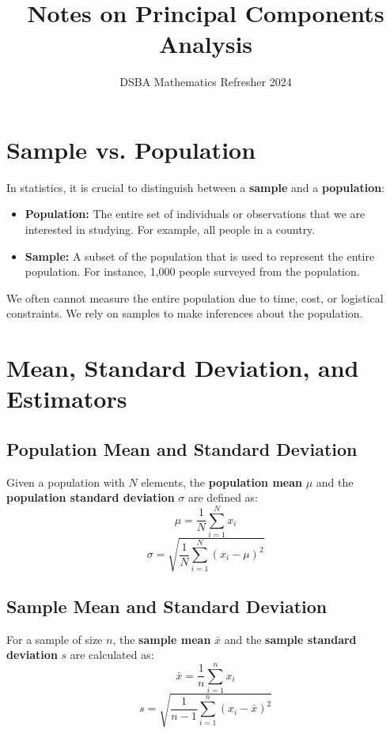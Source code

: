 \documentclass[]{article}
\title{Notes on Principal Components Analysis}
\author{DSBA Mathematics Refresher 2024}
\date{}
\begin{document}
	
	\maketitle
	
	\begin{abstract}
		
	\end{abstract}
	
	\section{Sample vs. Population}
	In statistics, it is crucial to distinguish between a \textbf{sample} and a \textbf{population}:
	\begin{itemize}
		\item \textbf{Population:}
		The entire set of individuals or observations that we are interested in studying. For example, all people in a country.
		\item \textbf{Sample:}
		A subset of the population that is used to represent the entire population. For instance, 1,000 people surveyed from the population.
	\end{itemize}
	
	We often cannot measure the entire population due to time, cost, or logistical constraints.
	We rely on samples to make inferences about the population.
	
	\section{Mean, Standard Deviation, and Estimators}
	\subsection{Population Mean and Standard Deviation}
	Given a population with $N$ elements, the \textbf{population mean} $\mu$ and the \textbf{population standard deviation} $\sigma$ are defined as:
	$$
	\mu = \frac{1}{N} \sum_{i=1}^N x_i
	$$
	$$
	\sigma = \sqrt{\frac{1}{N} \sum_{i=1}^N (x_i - \mu)^2}
	$$
	
	\subsection{Sample Mean and Standard Deviation}
	For a sample of size $n$, the \textbf{sample mean} $\bar{x}$ and the \textbf{sample standard deviation} $s$ are calculated as:
	$$
	\bar{x} = \frac{1}{n} \sum_{i=1}^n x_i
	$$
	$$
	s = \sqrt{\frac{1}{n-1} \sum_{i=1}^n (x_i - \bar{x})^2}
	$$
	
\end{document}
